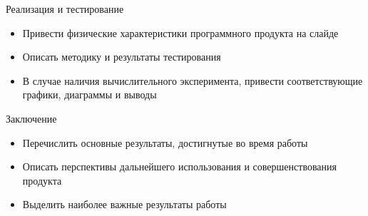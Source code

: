 \documentclass{../../cls/fefu_presentation}
\begin{document}
    \note{}
    
    \begin{frame}{Реализация и тестирование}
        \begin{block}{}
            \begin{itemize}
                \item Привести физические характеристики программного продукта на слайде
                \item Описать методику и результаты тестирования
                \item В случае наличия вычислительного эксперимента, привести соответствующие графики, диаграммы и выводы
            \end{itemize}
        \end{block}
    \end{frame}


    \begin{frame}{Заключение}
        \begin{block}{}
            \begin{itemize}
                \item Перечислить основные результаты, достигнутые во время работы
                \item Описать перспективы дальнейшего использования и совершенствования продукта
                \item Выделить наиболее важные результаты работы
            \end{itemize}
        \end{block}
    \end{frame}

    
\end{document}
